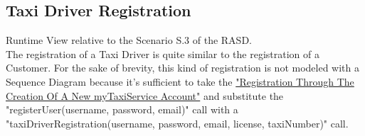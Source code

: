 \documentclass[../../../../../../dd.tex]{subfiles}
\begin{document}
	\subsection{Taxi Driver Registration}
		Runtime View relative to the Scenario S.3 of the RASD.\\
		The registration of a Taxi Driver is quite similar to the registration of a Customer.
		For the sake of brevity, this kind of registration is not modeled with a Sequence Diagram because it's sufficient to take the \hyperref[subsec:RegistrationNewAccount]{"Registration Through The Creation Of A New myTaxiService Account"} and substitute the "registerUser(username, password, email)" call with a "taxiDriverRegistration(username, password, email, license, taxiNumber)" call.
		
\end{document}
